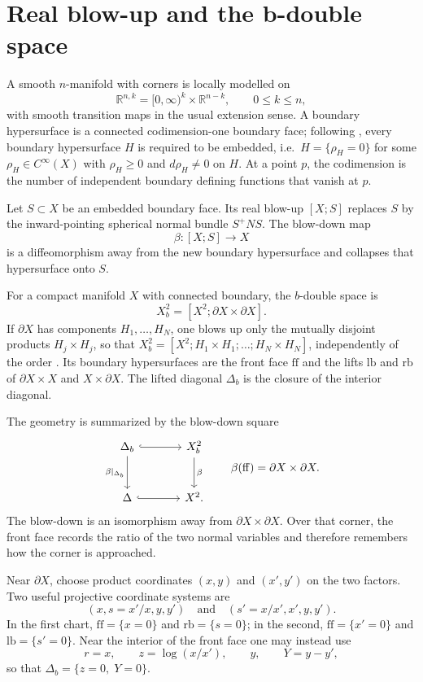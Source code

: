 \documentclass[12pt,oneside,reqno]{article}
\theoremstyle{plain}
\theoremstyle{definition}
\theoremstyle{remark}
\begin{document}
\section{Real blow-up and the b-double space}

A smooth $n$-manifold with corners is locally modelled on
\[
 \mathbb R^{n,k}=[0,\infty)^k\times\mathbb R^{n-k},
 \qquad 0\leq k\leq n,
\]
with smooth transition maps in the usual extension sense. A boundary
hypersurface is a connected codimension-one boundary face; following
\cite[Lecture~2, \S1]{MelroseBlowup}, every boundary hypersurface \(H\) is
required to be embedded, i.e.\ \(H=\{\rho_H=0\}\) for some
\(\rho_H\in C^\infty(X)\) with \(\rho_H\geq0\) and \(d\rho_H\neq0\) on
\(H\). At a point
$p$, the codimension is the number of independent boundary defining
functions that vanish at $p$.

Let $S\subset X$ be an embedded boundary face. Its real blow-up
$[X;S]$ replaces $S$ by the inward-pointing spherical normal bundle
$S^+NS$. The blow-down map
\[
 \beta:[X;S]\longrightarrow X
\]
is a diffeomorphism away from the new boundary hypersurface and
collapses that hypersurface onto $S$.

For a compact manifold $X$ with connected boundary, the $b$-double space is
\[
 X_b^2=[X^2;\partial X\times\partial X].
\]
If \(\partial X\) has components \(H_1,\ldots,H_N\), one blows up only the
mutually disjoint products \(H_j\times H_j\), so that
\(X_b^2=[X^2;H_1\times H_1;\ldots;H_N\times H_N]\), independently of the
order \cite[(2.28), (2.29)]{MelroseBlowup}. Its boundary hypersurfaces are the front face $\mathrm{ff}$ and the
lifts $\mathrm{lb}$ and $\mathrm{rb}$ of
$\partial X\times X$ and $X\times\partial X$. The lifted diagonal
$\Delta_b$ is the closure of the interior diagonal.

The geometry is summarized by the blow-down square
\[
\begin{tikzcd}[column sep=large,row sep=large]
 \Delta_b \arrow[r,hook] \arrow[d,"\beta|_{\Delta_b}"']
   & X_b^2 \arrow[d,"\beta"] \\
 \Delta \arrow[r,hook]
   & X^2 .
\end{tikzcd}
\qquad
\beta(\mathrm{ff})=\partial X\times\partial X.
\]
The blow-down is an isomorphism away from
\(\partial X\times\partial X\). Over that corner, the front face records
the ratio of the two normal variables and
therefore remembers how the corner is approached.

Near $\partial X$, choose product coordinates $(x,y)$ and $(x',y')$ on
the two factors. Two useful projective coordinate systems are
\[
 (x,s=x'/x,y,y')\quad\text{and}\quad
 (s'=x/x',x',y,y').
\]
In the first chart, $\mathrm{ff}=\{x=0\}$ and
$\mathrm{rb}=\{s=0\}$; in the second,
$\mathrm{ff}=\{x'=0\}$ and $\mathrm{lb}=\{s'=0\}$.
Near the interior of the front face one may instead use
\[
 r=x,\qquad z=\log(x/x'),\qquad y,\qquad Y=y-y',
\]
so that $\Delta_b=\{z=0,\;Y=0\}$.
\end{document}
